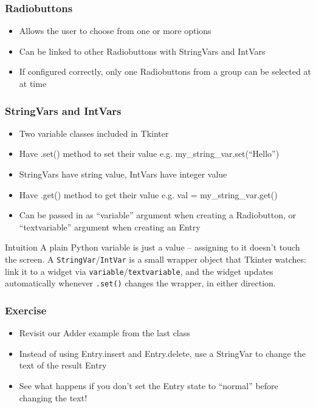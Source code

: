 \begin{frame}[fragile] \frametitle{Radiobuttons}
\begin{itemize}
\item Allows the user to choose from one or more options
\item Can be linked to other Radiobuttons with StringVars and IntVars
\item If configured correctly, only one Radiobuttons from a group can be selected at at time
\end{itemize}
\end{frame}

\begin{frame}[fragile] \frametitle{StringVars and IntVars}
\begin{itemize}
\item Two variable classes included in Tkinter
\item Have .set() method to set their value
e.g. my\_string\_var.set(``Hello'')
\item StringVars have string value, IntVars have integer value
\item Have .get() method to get their value
e.g. val = my\_string\_var.get()
\item Can be passed in as ``variable'' argument when creating a Radiobutton, or ``textvariable'' argument when creating an Entry

\end{itemize}
\begin{block}{Intuition}
A plain Python variable is just a value -- assigning to it doesn't touch the screen. A \texttt{StringVar}/\texttt{IntVar} is a small wrapper object that Tkinter watches: link it to a widget via \texttt{variable}/\texttt{textvariable}, and the widget updates automatically whenever \texttt{.set()} changes the wrapper, in either direction.
\end{block}
\end{frame}

\begin{frame}[fragile] \frametitle{Exercise}
\begin{itemize}
\item Revisit our Adder example from the last class
\item Instead of using Entry.insert and Entry.delete, use a StringVar to change the text of the result Entry
\item See what happens if you don't set the Entry state to ``normal'' before changing the text!
\end{itemize}
\end{frame}

